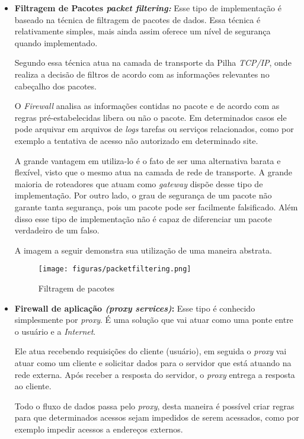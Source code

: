 \begin{itemize}
\item \textbf{Filtragem de Pacotes \textit{packet filtering:}} Esse tipo de implementação é baseado na técnica de filtragem de pacotes de dados. Essa técnica é relativamente simples, mais ainda assim oferece um nível de segurança quando implementado.

Segundo  essa técnica atua na camada de transporte da Pilha \textit{TCP/IP}, onde realiza a decisão de filtros de acordo com as informações relevantes no cabeçalho dos pacotes.

O \textit{Firewall} analisa as informações contidas no pacote e de acordo com as regras pré-estabelecidas libera ou não o pacote. Em determinados casos ele pode arquivar em arquivos de \textit{logs} tarefas ou serviços relacionados, como por exemplo a tentativa de acesso não autorizado em determinado site.

A grande vantagem em utiliza-lo é o fato de ser uma alternativa barata e flexível, visto que o mesmo atua na camada de rede de transporte. A grande maioria de roteadores que atuam como \textit{gateway} dispõe desse tipo de implementação. Por outro lado, o grau de segurança de um pacote não garante tanta segurança, pois um pacote pode ser facilmente falsificado. Além disso esse tipo de implementação não é capaz de diferenciar um pacote verdadeiro de um falso.

A imagem a seguir demonstra sua utilização de uma maneira abstrata.

\begin{figure}[!h]
\centering
\texttt{[image: figuras/packetfiltering.png]}
\caption{Filtragem de pacotes} 	
\end{figure}

\item \textbf{Firewall de aplicação \textit{(proxy services)}:} Esse tipo é conhecido simplesmente por \textit{proxy}. É uma solução que vai atuar como uma ponte entre o usuário e a \textit{Internet}. 

Ele atua recebendo requisições do cliente (usuário), em seguida o \textit{proxy} vai atuar como um cliente e solicitar dados para o servidor que está atuando na rede externa. Após receber a resposta do servidor, o \textit{proxy} entrega a resposta ao cliente.

Todo o fluxo de dados passa pelo \textit{proxy}, desta maneira é possível criar regras para que determinados acessos sejam impedidos de serem acessados, como por exemplo impedir acessos a endereços externos.


\end{itemize}
